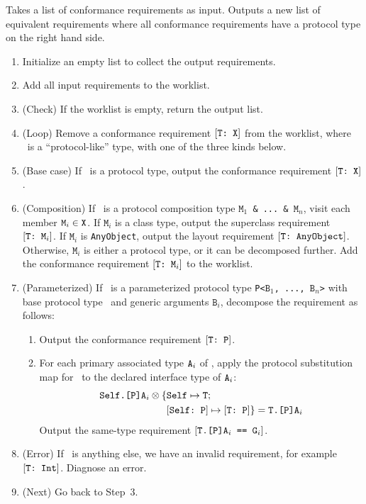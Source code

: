 \documentclass[../generics]{subfiles}
\begin{document}
\begin{algorithm}\label{expand conformance req algorithm} Takes a list of conformance requirements as input. Outputs a new list of equivalent requirements where all conformance requirements have a protocol type on the right hand side.
\begin{enumerate}
\item Initialize an empty list to collect the output requirements.
\item Add all input requirements to the worklist.
\item (Check) If the worklist is empty, return the output list.
\item (Loop) Remove a conformance requirement $[\texttt{T:~X}]$ from the worklist, where \tX\ is a ``protocol-like'' type, with one of the three kinds below.
\item (Base case) If \tX\ is a protocol type, output the conformance requirement $[\texttt{T:~X}]$.
\item (Composition) If \tX\ is a protocol composition type \texttt{$\texttt{M}_1$ \& ...~\& $\texttt{M}_n$}, visit each member $\texttt{M}_i\in\texttt{X}$. If $\texttt{M}_i$ is a class type, output the superclass requirement $[\texttt{T:~$\texttt{M}_i$}]$. If $\texttt{M}_i$ is \texttt{AnyObject}, output the layout requirement $[\texttt{T:~AnyObject}]$. Otherwise, $\texttt{M}_i$ is either a protocol type, or it can be decomposed further. Add the conformance requirement $[\texttt{T:~$\texttt{M}_i$}]$ to the worklist.
\item (Parameterized) If \tX\ is a parameterized protocol type \texttt{P<$\texttt{B}_1$, ..., $\texttt{B}_n$>} with base protocol type \tP\ and generic arguments $\texttt{B}_i$, decompose the requirement as follows:
\begin{enumerate}
\item Output the conformance requirement $[\texttt{T:~P}]$.
\item For each primary associated type $\texttt{A}_i$ of \tP, apply the protocol substitution map for \tT\ to the declared interface type of $\texttt{A}_i$:
\begin{align*}
\texttt{Self.[P]A}_i \otimes \{&\texttt{Self} \mapsto \texttt{T};\,\\
&[\texttt{Self:~P}] \mapsto [\texttt{T:~P}]\} = \texttt{T.[P]A}_i
\end{align*}
Output the same-type requirement $[\texttt{$\texttt{T.[P]A}_i$ == $\texttt{G}_i$}]$.
\end{enumerate}
\item (Error) If \tX\ is anything else, we have an invalid requirement, for example $[\texttt{T:~Int}]$. Diagnose an error.
\item (Next) Go back to Step~3.
\end{enumerate}
\end{algorithm}
\end{document}
